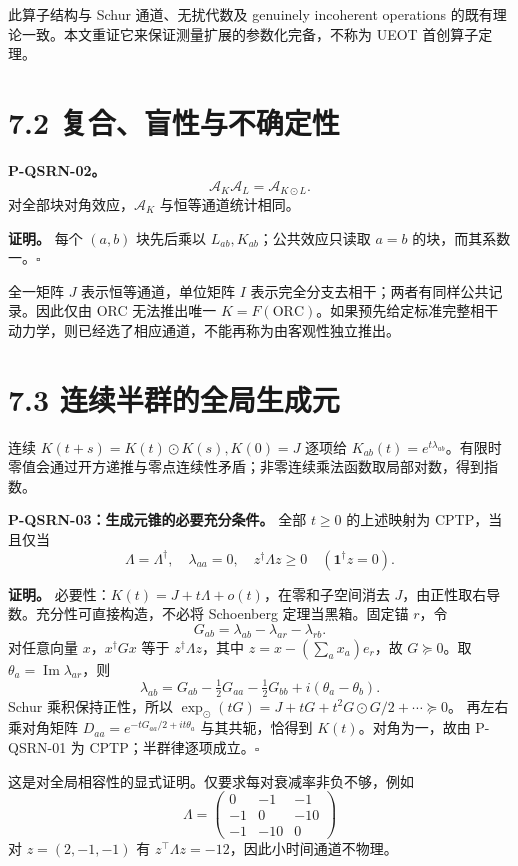 \documentclass[
  11pt,
  oneside]{book}
\begin{document}
此算子结构与 Schur 通道、无扰代数及 genuinely incoherent operations
的既有理论一致。本文重证它来保证测量扩展的参数化完备，不称为 UEOT
首创算子定理。

\section{7.2 复合、盲性与不确定性}

\protect\hypertarget{p-qsrn-02}{}{}

\textbf{P-QSRN-02。} \[
\mathcal A_K\mathcal A_L=\mathcal A_{K\odot L}.
\] 对全部块对角效应，\(\mathcal A_K\) 与恒等通道统计相同。

\textbf{证明。} 每个 \((a,b)\) 块先后乘以
\(L_{ab},K_{ab}\)；公共效应只读取 \(a=b\) 的块，而其系数一。\(\square\)

全一矩阵 \(J\) 表示恒等通道，单位矩阵 \(I\)
表示完全分支去相干；两者有同样公共记录。因此仅由 ORC 无法推出唯一
\(K=F(\mathrm{ORC})\)。如果预先给定标准完整相干动力学，则已经选了相应通道，不能再称为由客观性独立推出。

\section{7.3 连续半群的全局生成元}

连续 \(K(t+s)=K(t)\odot K(s),K(0)=J\) 逐项给
\(K_{ab}(t)=e^{t\lambda_{ab}}\)。有限时零值会通过开方递推与零点连续性矛盾；非零连续乘法函数取局部对数，得到指数。

\protect\hypertarget{p-qsrn-03}{}{}

\textbf{P-QSRN-03：生成元锥的必要充分条件。} 全部 \(t\ge0\) 的上述映射为
CPTP，当且仅当 \[
\Lambda=\Lambda^\dagger,\quad\lambda_{aa}=0,\quad
z^\dagger\Lambda z\ge0\quad(\mathbf1^\dagger z=0).
\]

\textbf{证明。} 必要性：\(K(t)=J+t\Lambda+o(t)\)，在零和子空间消去
\(J\)，由正性取右导数。充分性可直接构造，不必将 Schoenberg
定理当黑箱。固定锚 \(r\)，令 \[
G_{ab}=\lambda_{ab}-\lambda_{ar}-\lambda_{rb}.
\] 对任意向量 \(x\)，\(x^\dagger Gx\) 等于 \(z^\dagger\Lambda z\)，其中
\(z=x-(\sum_ax_a)e_r\)，故 \(G\succeq0\)。取
\(\theta_a=\operatorname{Im}\lambda_{ar}\)，则 \[
\lambda_{ab}=G_{ab}-\tfrac12G_{aa}-\tfrac12G_{bb}
+i(\theta_a-\theta_b).
\] Schur 乘积保持正性，所以
\(\exp_\odot(tG)=J+tG+t^2G\odot G/2+\cdots\succeq0\)。 再左右乘对角矩阵
\(D_{aa}=e^{-tG_{aa}/2+it\theta_a}\) 与其共轭，恰得到
\(K(t)\)。对角为一，故由 P-QSRN-01 为 CPTP；半群律逐项成立。\(\square\)

这是对全局相容性的显式证明。仅要求每对衰减率非负不够，例如 \[
\Lambda=\begin{pmatrix}0&-1&-1\\-1&0&-10\\-1&-10&0\end{pmatrix}
\] 对 \(z=(2,-1,-1)\) 有 \(z^\top\Lambda z=-12\)，因此小时间通道不物理。
\end{document}

